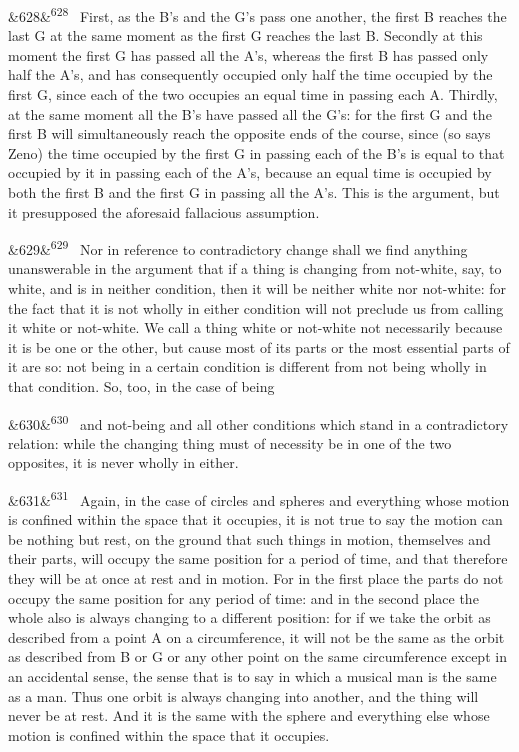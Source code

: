 \documentclass[12pt]{article}
\newcommand{\para}[1][]{\par\noindent\ifx&#1&\else\textsuperscript{\footnotesize #1}~\fi}
\begin{document}
\para[628] First, as the B's and the G's pass one another, the first B reaches the last G at the same moment as the first G reaches the last B. Secondly at this moment the first G has passed all the A's, whereas the first B has passed only half the A's, and has consequently occupied only half the time occupied by the first G, since each of the two occupies an equal time in passing each A. Thirdly, at the same moment all the B's have passed all the G's: for the first G and the first B will simultaneously reach the opposite ends of the course, since (so says Zeno) the time occupied by the first G in passing each of the B's is equal to that occupied by it in passing each of the A's, because an equal time is occupied by both the first B and the first G in passing all the A's. This is the argument, but it presupposed the aforesaid fallacious assumption.

\para[629] Nor in reference to contradictory change shall we find anything unanswerable in the argument that if a thing is changing from not-white, say, to white, and is in neither condition, then it will be neither white nor not-white: for the fact that it is not wholly in either condition will not preclude us from calling it white or not-white. We call a thing white or not-white not necessarily because it is be one or the other, but cause most of its parts or the most essential parts of it are so: not being in a certain condition is different from not being wholly in that condition. So, too, in the case of being

\para[630] and not-being and all other conditions which stand in a contradictory relation: while the changing thing must of necessity be in one of the two opposites, it is never wholly in either.

\para[631] Again, in the case of circles and spheres and everything whose motion is confined within the space that it occupies, it is not true to say the motion can be nothing but rest, on the ground that such things in motion, themselves and their parts, will occupy the same position for a period of time, and that therefore they will be at once at rest and in motion. For in the first place the parts do not occupy the same position for any period of time: and in the second place the whole also is always changing to a different position: for if we take the orbit as described from a point A on a circumference, it will not be the same as the orbit as described from B or G or any other point on the same circumference except in an accidental sense, the sense that is to say in which a musical man is the same as a man. Thus one orbit is always changing into another, and the thing will never be at rest. And it is the same with the sphere and everything else whose motion is confined within the space that it occupies.
\end{document}
